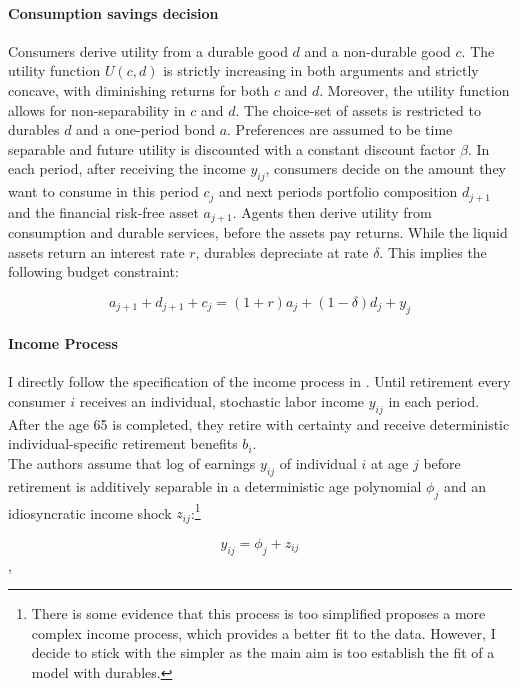 \documentclass[12pt,a4paper,leqno]{article}
\theoremstyle{definition}
\begin{document}
\paragraph{Consumption savings decision}
Consumers derive utility from a durable good $d$ and a non-durable good $c$. The utility function $U(c,d)$ is strictly increasing in both arguments and strictly concave, with diminishing returns for both $c$ and $d$. Moreover, the utility function allows for non-separability in $c$ and $d$. The choice-set of assets is restricted to durables $d$ and a one-period bond $a$. Preferences are assumed to be time separable and future utility is discounted with a constant discount factor $\beta$.
In each period, after receiving the income $y_{ij}$, consumers decide on the amount they want to consume in this period $c_{j}$ and next periods portfolio composition $d_{j+1}$ and the financial risk-free asset $a_{j+1}$. Agents then derive utility from consumption and durable services, before the assets pay returns. While the liquid assets return an interest rate $r$, durables depreciate at rate $\delta$. This implies the following budget constraint:  

\begin{equation}
a_{j+1}+d_{j+1}+c_{j}=(1+r)a_{j} + (1-\delta)d_{j}+y_{j}
\end{equation}

\paragraph{Income Process}
I directly follow the specification of the income process in \cite{hintermaier2011}. Until retirement every consumer $i$ receives an individual, stochastic labor income $y_{ij}$ in each period. After the age 65 is completed, they retire with certainty and receive deterministic individual-specific retirement benefits $b_{i}$. \\
The authors assume that log of earnings $y_{ij}$ of individual $i$ at age $j$ before retirement is additively separable in a deterministic age polynomial $\phi_{j}$ and an idiosyncratic income shock $z_{ij}$:\footnote{There is some evidence that this process is too simplified \cite{guvenen2015data} proposes a more complex income process, which provides a better fit to the data. However, I decide to stick with the simpler as the main aim is too establish the fit of a model with durables.} 

\begin{equation}\label{eq:income_process}
y_{ij}=\phi_{j}+z_{ij}
\end{equation},
\end{document}
